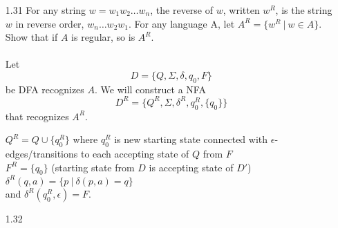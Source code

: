 \begin{enumerate}

    \item [1.31]
          For any string $w = w_1w_2\ldots w_n$, the reverse of $w$, written $w^R$, is the string $w$ in reverse order, $w_n \ldots w_2w_1$. For any language A, let $A^R = \{w^R ~|~ w \in A\}$. Show that if $A$ is regular, so is $A^R$.
          \\
          \\
          Let $$D = \{Q, \Sigma, \delta, q_0, F\}$$ be DFA recognizes $A$. We will construct a NFA $$D^R = \{Q^R, \Sigma, \delta^R, q^R_0, \{q_0\}\}$$ that recognizes $A^R$.

          $Q^R = Q \cup \{q^R_0\}$ where $q^R_0$ is new starting state connected with $\epsilon$-edges/transitions to each accepting state of $Q$ from $F$  \\
          $F^R = \{q_0\}$ (starting state from $D$ is accepting state of $D'$) \\
          $\delta^R(q, a) = \{p ~|~ \delta(p, a) = q\}$ \\
          and $\delta^R(q^R_0, \epsilon) = F$.





    \item [1.32]


\end{enumerate}
